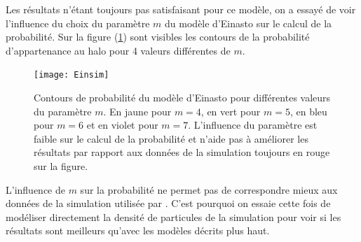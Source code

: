 Les résultats n'étant toujours pas satisfaisant pour ce modèle, on a essayé de voir l'influence du choix du paramètre $m$ du modèle
d'Einasto sur le calcul de la probabilité. Sur la figure (\ref{fig:Einsim}) sont visibles les contours de la probabilité
d'appartenance au halo pour \num{4} valeurs différentes de $m$.
\begin{figure}[htb]
	\centering
	\texttt{[image: Einsim]}
	\caption{\footnotesize{}Contours de probabilité du modèle d'Einasto pour différentes valeurs du paramètre $m$. En jaune
	pour $m=4$, en vert pour $m=5$, en bleu pour $m=6$ et en violet pour $m=7$. L'influence du paramètre est faible sur le
	calcul de la probabilité et n'aide pas à améliorer les résultats par rapport aux données de la simulation toujours en rouge
	sur la figure.}
	\label{fig:Einsim}
\end{figure}
L'influence de $m$ sur la probabilité ne permet pas de correspondre mieux aux données de la simulation utilisée par \citet{MBM10}.
C'est pourquoi on essaie cette fois de modéliser directement la densité de particules de la simulation pour voir si les résultats
sont meilleurs qu'avec les modèles décrits plus haut.

